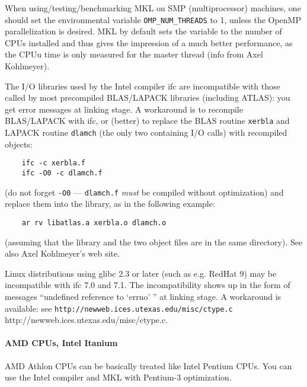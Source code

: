 \documentclass[12pt,a4paper]{article}
\begin{document}
When using/testing/benchmarking MKL on SMP (multiprocessor)
machines, one should set the environmental variable 
\texttt{OMP\_NUM\_THREADS} to 1, unless the OpenMP 
parallelization is desired. MKL by default sets the
variable to the number of CPUs installed and thus gives
the impression of a much better performance, as the CPUu time
is only measured for the master thread (info from Axel Kohlmeyer).

The I/O libraries used by the Intel compiler ifc are incompatible 
with those called by most precompiled BLAS/LAPACK libraries 
(including ATLAS): you get error messages at linking stage.
A workaround is to recompile BLAS/LAPACK with ifc, or (better) to
replace the BLAS routine \texttt{xerbla} and LAPACK routine
\texttt{dlamch} (the only two containing I/O calls) with recompiled
objects:
\begin{verbatim}
    ifc -c xerbla.f
    ifc -O0 -c dlamch.f
\end{verbatim}
(do not forget \texttt{-O0} --- \texttt{dlamch.f} \emph{must} be
compiled without optimization) and replace them into the library, as
in the following example:
\begin{verbatim}
    ar rv libatlas.a xerbla.o dlamch.o
\end{verbatim}
(assuming that the library and the two object files are in the same
directory). See also Axel Kohlmeyer's web site.

Linux distributions using glibc 2.3 or later (such as e.g. RedHat 9)
may be incompatible with ifc 7.0 and 7.1.
The incompatibility shows up in the form of messages ``undefined
reference to `errno' '' at linking stage.
A workaround is available: see
\htmladdnormallink%
{\texttt{http://newweb.ices.utexas.edu/misc/ctype.c}}%
{http://newweb.ices.utexas.edu/misc/ctype.c}.

\paragraph{AMD CPUs, Intel Itanium}

AMD Athlon CPUs can be basically treated like Intel Pentium CPUs.
You can use the Intel compiler and MKL with Pentium-3 optimization.
\end{document}
